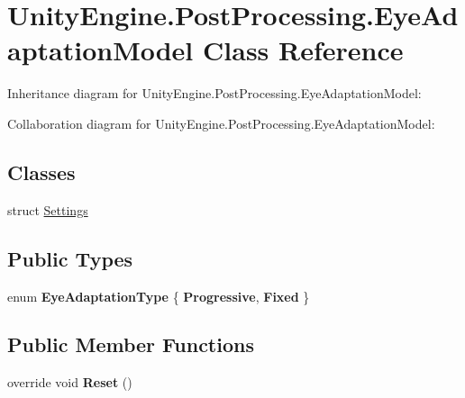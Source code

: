\hypertarget{class_unity_engine_1_1_post_processing_1_1_eye_adaptation_model}{}\section{Unity\+Engine.\+Post\+Processing.\+Eye\+Adaptation\+Model Class Reference}
\label{class_unity_engine_1_1_post_processing_1_1_eye_adaptation_model}


Inheritance diagram for Unity\+Engine.\+Post\+Processing.\+Eye\+Adaptation\+Model\+:


Collaboration diagram for Unity\+Engine.\+Post\+Processing.\+Eye\+Adaptation\+Model\+:
\subsection*{Classes}
\begin{DoxyCompactItemize}
\item 
struct \hyperlink{struct_unity_engine_1_1_post_processing_1_1_eye_adaptation_model_1_1_settings}{Settings}
\end{DoxyCompactItemize}
\subsection*{Public Types}
\begin{DoxyCompactItemize}
\item 
\mbox{\label{class_unity_engine_1_1_post_processing_1_1_eye_adaptation_model_ab9307d267c9dc71faf8705f539a5d30b}} 
enum {\bfseries Eye\+Adaptation\+Type} \{ {\bfseries Progressive}, 
{\bfseries Fixed}
 \}
\end{DoxyCompactItemize}
\subsection*{Public Member Functions}
\begin{DoxyCompactItemize}
\item 
\mbox{\label{class_unity_engine_1_1_post_processing_1_1_eye_adaptation_model_a055eae23b68fd6d5b6ab1d98c306e814}} 
override void {\bfseries Reset} ()
\end{DoxyCompactItemize}
